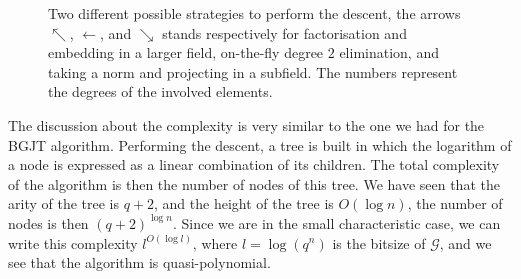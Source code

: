 \documentclass[a4paper,11pt]{article}
\theoremstyle{break}
\theoremstyle{sc}
\theoremstyle{definition}
\theoremstyle{remark}
\begin{document}
\begin{figure}
  \label{fig:recurse}
  \caption{Two different possible strategies to perform the descent, the arrows
  $\nwarrow$, $\leftarrow$, and $\searrow$ stands respectively for
factorisation and embedding in a larger field, on-the-fly degree $2$
elimination, and taking a norm and projecting in a subfield. The numbers
represent the degrees of the involved elements.}
\end{figure}

The discussion about the complexity is very similar to the one we had for the
BGJT algorithm. Performing the
descent, a tree is built in which the logarithm of a node is expressed
as a linear combination of its children. The total complexity of the algorithm
is then the number of nodes of this tree. We have seen that the arity of the
tree is $q+2$, and the height of the tree is $O(\log n)$, the number of nodes
is then $(q+2)^{\log n}$. Since we are in the small characteristic case, we
can write this complexity $l^{O(\log l)}$, where $l=\log(q^n)$ is the bitsize of
$\mathcal G$, and we see that the algorithm is quasi-polynomial.
\end{document}
